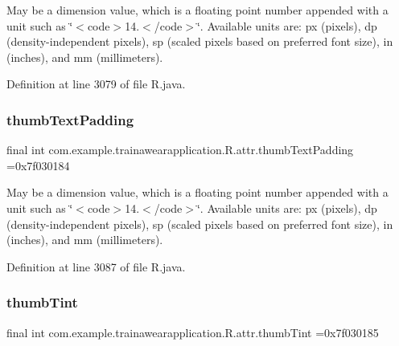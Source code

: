 May be a dimension value, which is a floating point number appended with a unit such as \char`\"{}$<$code$>$14.\+5sp$<$/code$>$\char`\"{}. Available units are\+: px (pixels), dp (density-\/independent pixels), sp (scaled pixels based on preferred font size), in (inches), and mm (millimeters). 

Definition at line 3079 of file R.\+java.

\mbox{\label{classcom_1_1example_1_1trainawearapplication_1_1_r_1_1attr_adf7b05515dfb5928d2f150075c9201b5}} 
\subsubsection{\texorpdfstring{thumbTextPadding}{thumbTextPadding}}
{\footnotesize\ttfamily final int com.\+example.\+trainawearapplication.\+R.\+attr.\+thumb\+Text\+Padding =0x7f030184\hspace{0.3cm}{\ttfamily [static]}}

May be a dimension value, which is a floating point number appended with a unit such as \char`\"{}$<$code$>$14.\+5sp$<$/code$>$\char`\"{}. Available units are\+: px (pixels), dp (density-\/independent pixels), sp (scaled pixels based on preferred font size), in (inches), and mm (millimeters). 

Definition at line 3087 of file R.\+java.

\mbox{\label{classcom_1_1example_1_1trainawearapplication_1_1_r_1_1attr_afc9b5cac7660ecd32144237abe4bc5a7}} 
\subsubsection{\texorpdfstring{thumbTint}{thumbTint}}
{\footnotesize\ttfamily final int com.\+example.\+trainawearapplication.\+R.\+attr.\+thumb\+Tint =0x7f030185\hspace{0.3cm}{\ttfamily [static]}}

